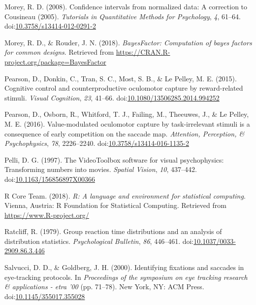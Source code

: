 \documentclass[jou, a4paper, noextraspace,floatsintext]{apa6}
\theoremstyle{definition}
\theoremstyle{definition}
\theoremstyle{definition}
\theoremstyle{remark}
\begin{document}
\hypertarget{ref-Morey2008}{}
Morey, R. D. (2008). Confidence intervals from normalized data: A
correction to Cousineau (2005). \emph{Tutorials in Quantitative Methods
for Psychology}, \emph{4}, 61--64.
doi:\href{https://doi.org/10.3758/s13414-012-0291-2}{10.3758/s13414-012-0291-2}

\hypertarget{ref-R-BayesFactor}{}
Morey, R. D., \& Rouder, J. N. (2018). \emph{BayesFactor: Computation of
bayes factors for common designs}. Retrieved from
\url{https://CRAN.R-project.org/package=BayesFactor}

\hypertarget{ref-Pearson2015}{}
Pearson, D., Donkin, C., Tran, S. C., Most, S. B., \& Le Pelley, M. E.
(2015). Cognitive control and counterproductive oculomotor capture by
reward-related stimuli. \emph{Visual Cognition}, \emph{23}, 41--66.
doi:\href{https://doi.org/10.1080/13506285.2014.994252}{10.1080/13506285.2014.994252}

\hypertarget{ref-Pearson2016}{}
Pearson, D., Osborn, R., Whitford, T. J., Failing, M., Theeuwes, J., \&
Le Pelley, M. E. (2016). Value-modulated oculomotor capture by
task-irrelevant stimuli is a consequence of early competition on the
saccade map. \emph{Attention, Perception, \& Psychophysics}, \emph{78},
2226--2240.
doi:\href{https://doi.org/10.3758/s13414-016-1135-2}{10.3758/s13414-016-1135-2}

\hypertarget{ref-Pelli1997}{}
Pelli, D. G. (1997). The VideoToolbox software for visual psychophysics:
Transforming numbers into movies. \emph{Spatial Vision}, \emph{10},
437--442.
doi:\href{https://doi.org/10.1163/156856897X00366}{10.1163/156856897X00366}

\hypertarget{ref-R-base}{}
R Core Team. (2018). \emph{R: A language and environment for statistical
computing}. Vienna, Austria: R Foundation for Statistical Computing.
Retrieved from \url{https://www.R-project.org/}

\hypertarget{ref-Ratcliff1979}{}
Ratcliff, R. (1979). Group reaction time distributions and an analysis
of distribution statistics. \emph{Psychological Bulletin}, \emph{86},
446--461.
doi:\href{https://doi.org/10.1037/0033-2909.86.3.446}{10.1037/0033-2909.86.3.446}

\hypertarget{ref-Salvucci2000}{}
Salvucci, D. D., \& Goldberg, J. H. (2000). Identifying fixations and
saccades in eye-tracking protocols. In \emph{Proceedings of the
symposium on eye tracking research \& applications - etra '00} (pp.
71--78). New York, NY: ACM Press.
doi:\href{https://doi.org/10.1145/355017.355028}{10.1145/355017.355028}
\end{document}
